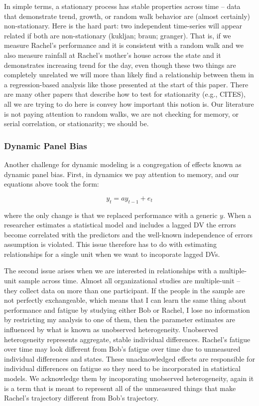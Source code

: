 \documentclass[english,,man]{apa6}
\theoremstyle{definition}
\theoremstyle{definition}
\theoremstyle{definition}
\theoremstyle{remark}
\begin{document}
In simple terms, a stationary process has stable properties across time
-- data that demonstrate trend, growth, or random walk behavior are
(almost certainly) non-stationary. Here is the hard part: two
independent time-series will appear related if both are non-stationary
(kukljan; braun; granger). That is, if we measure Rachel's performance
and it is consistent with a random walk and we also measure rainfall at
Rachel's mother's house across the state and it demonstrates increasing
trend for the day, even though these two things are completely unrelated
we will more than likely find a relationship between them in a
regression-based analysis like those presented at the start of this
paper. There are many other papers that describe how to test for
stationarity (e.g., CITES), all we are trying to do here is convey how
important this notion is. Our literature is not paying attention to
random walks, we are not checking for memory, or serial correlation, or
stationarity; we should be.

\hypertarget{dynamic-panel-bias}{%
\subsubsection{Dynamic Panel Bias}\label{dynamic-panel-bias}}

Another challenge for dynamic modeling is a congregation of effects
known as dynamic panel bias. First, in dynamics we pay attention to
memory, and our equations above took the form:

\begin{equation}
y_{t} = a y_{t-1} + e_{t}
\end{equation}

\noindent where the only change is that we replaced performance with a
generic \(y\). When a researcher estimates a statistical model and
includes a lagged DV the errors become correlated with the predictors
and the well-known independence of errors assumption is violated. This
issue therefore has to do with estimating relationships for a single
unit when we want to incoporate lagged DVs.

The second issue arises when we are interested in relationships with a
multiple-unit sample across time. Almost all organizational studies are
multiple-unit -- they collect data on more than one participant. If the
people in the sample are not perfectly exchangeable, which means that I
can learn the same thing about performance and fatigue by studying
either Bob or Rachel, I lose no information by restricting my analysis
to one of them, then the parameter estimates are influenced by what is
known as unobserved heterogeneity. Unobserved heterogeneity represents
aggregate, stable individual differences. Rachel's fatigue over time may
look different from Bob's fatigue over time due to unmeasured individual
differences and states. These unacknowledged effects are responsible for
individual differences on fatigue so they need to be incorporated in
statistical models. We acknowledge them by incoporating unobserved
heterogeneity, again it is a term that is meant to represent all of the
unmeasured things that make Rachel's trajectory different from Bob's
trajectory.
\end{document}
